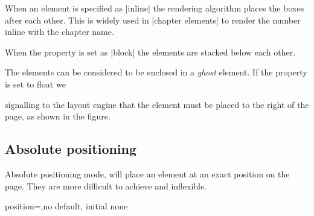 When an element is specified as |inline| the rendering algorithm places the boxes after each other. This is widely used in |chapter elements| to render the number inline with the chapter name.
\medskip
\bgroup

\noindent
{}
 
When the property is set as |block| the elements are stacked below each other.
\medskip


The elements can be considered to be enclosed in a \emph{ghost} element. If the property is set to float we
\begin{figure}[htbp]
\makeatletter
\parindent0pt
\par
\vspace*{2cm}
\makeatother
\end{figure}
signalling to the layout engine that the element must be placed to the right of the page, as shown in the figure. 


\begin{figure}[htbp]
\makeatletter
\parindent0pt
\par
\vspace*{2cm}
\makeatother
\end{figure}

\subsection{Absolute positioning}

Absolute positioning mode, will place an element at an exact position on the page. They are more difficult to
achieve and inflexible. 

\begin{docKey}{position}{=,}{no default, initial none}{}

\end{docKey}




